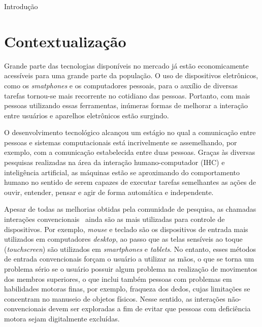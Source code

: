 \begin{chapter}{Introdução}
\vspace{-0.5cm}
\section{Contextualização}
Grande parte das tecnologias disponíveis no mercado já estão economicamente
acessíveis para uma grande parte da população. O uso de dispositivos
eletrônicos, como os \textit{smatphones} e os computadores pessoais, para o
auxílio de diversas tarefas tornou-se mais recorrente no cotidiano das pessoas.
Portanto, com mais pessoas utilizando essas ferramentas, inúmeras formas de
melhorar a interação entre usuários e aparelhos eletrônicos estão surgindo. %

O desenvolvimento tecnológico alcançou um estágio no qual a comunicação entre
pessoas e sistemas computacionais está incrivelmente se assemelhando, por
exemplo, com a comunicação estabelecida entre duas pessoas. Graças às diversas
pesquisas realizadas na área da interação humano-computador (IHC) e inteligência
artificial, as máquinas estão se aproximando do comportamento humano no sentido
de serem capazes de executar tarefas semelhantes as ações de ouvir, entender,
pensar e agir de forma automática e independente. %

Apesar de todas as melhorias obtidas pela comunidade de pesquisa, as chamadas
interações convencionais~\cite{Preece15} ainda são as mais utilizadas para
controle de dispositivos. Por exemplo, \textit{mouse} e teclado são os
dispositivos de entrada mais utilizados em computadores \textit{desktop}, ao
passo que as telas sensíveis ao toque (\textit{touchscreen}) são utilizados em
\textit{smartphones} e \textit{tablets}. No entanto, esses métodos de entrada
convencionais forçam o usuário a utilizar as mãos, o que se torna um problema
sério se o usuário possuir algum problema na realização de movimentos dos
membros superiores, o que inclui também pessoas com problemas em habilidades
motoras finas, por exemplo, fraqueza dos dedos, cujas limitações se concentram
no manuseio de objetos físicos. Nesse sentido, as interações não-convencionais
devem ser exploradas a fim de evitar que pessoas com deficiência motora sejam
digitalmente excluídas.  


\end{chapter}
